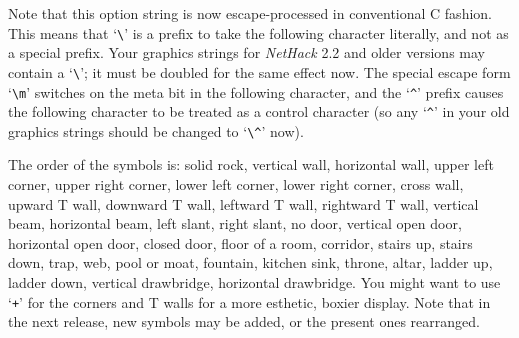 Note that this option string is now escape-processed in conventional C
fashion.  This means that `\verb+\+' is a prefix to take the following
character literally, and not as a special prefix.  Your graphics
strings for {\it NetHack\/} 2.2 and older versions may contain a `\verb+\+';
it must be doubled for the same effect now.  The special escape form
`\verb+\m+' switches on the meta bit in the following character, and the
`{\tt \^{}}' prefix causes the following character to be treated as a control
character (so any `{\tt \^{}}' in your old graphics strings should be changed
to `\verb+\^+' now).

The order of the symbols is:  solid rock, vertical wall, horizontal
wall, upper left corner, upper right corner, lower left corner, lower
right corner, cross wall, upward T wall, downward T wall, leftward T
wall, rightward T wall, vertical beam, horizontal beam, left slant,
right slant, no door, vertical open door, horizontal open door, closed
door, floor of a room, corridor, stairs up, stairs down, trap, web,
pool or moat, fountain, kitchen sink, throne, altar, ladder up, ladder
down, vertical drawbridge, horizontal drawbridge.
You might want to use `{\tt +}' for the corners and T walls for a more
esthetic, boxier display.  Note that in the next release, new symbols
may be added, or the present ones rearranged.

